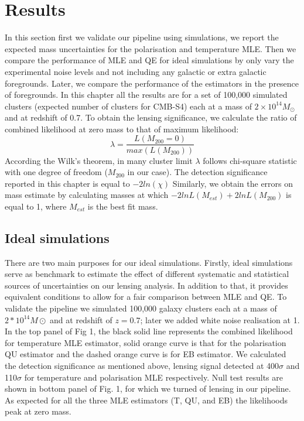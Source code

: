  
 \section{Results}

 In this section first we validate our pipeline using simulations, we report the expected mass uncertainties for the polarisation and temperature MLE. 
 Then we compare the performance of MLE and QE for ideal simulations by only vary the experimental noise levels and not including any galactic or extra galactic foregrounds. 
 Later, we compare the performance of the estimators in the presence of foregrounds. 
 In this chapter all the results are for a set of 100,000 simulated clusters (expected number of clusters for CMB-S4) each at a mass of $2\times10^{14} M_{\odot}$ and at redshift of 0.7.
 To obtain the lensing significance, we calculate the ratio of combined likelihood at zero mass to that of maximum likelihood:
 \begin{equation}
 \lambda = \frac{L (M_{200} =0)}{max(L(M_{200}))}
 \end{equation} 
 According the Wilk's theorem, in many cluster limit $\lambda $ follows chi-square statistic with one degree of freedom ($M_{200}$ in our case).
 The detection significance reported in this chapter is equal to $-2 ln (\chi)$
 Similarly, we obtain the errors on mass estimate by calculating masses at which $-2lnL(M_{est}) + 2 ln L (M_{200})$ is equal to 1, where $M_{est}$ is the best fit mass.
 
 
 \subsection{Ideal simulations}
 There are two main purposes for our ideal simulations. 
 Firstly, ideal simulations serve as benchmark to estimate the effect of different systematic and statistical sources of uncertainties on our lensing analysis. 
 In addition to that, it provides equivalent conditions to allow for a fair comparison between MLE and QE.
 To validate the pipeline we simulated 100,000 galaxy clusters each at a mass of $2*10^{14} M{\odot}$ and at redshift of $z = 0.7$; later we added white noise realisation at 1\ukam.
 In the top panel of Fig 1, the black solid line represents the combined likelihood for temperature MLE estimator, solid orange curve is that for the polarisation QU estimator and the dashed orange curve is for EB estimator. 
 We calculated the detection significance as mentioned above, lensing signal detected at 400$\sigma$ and 110$\sigma$ for temperature and polarisation MLE respectively. 
 Null test results are shown in bottom panel of Fig. 1, for which we turned of lensing in our pipeline.
 As expected for all the three MLE estimators (T, QU, and EB) the likelihoods peak at zero mass.
 
